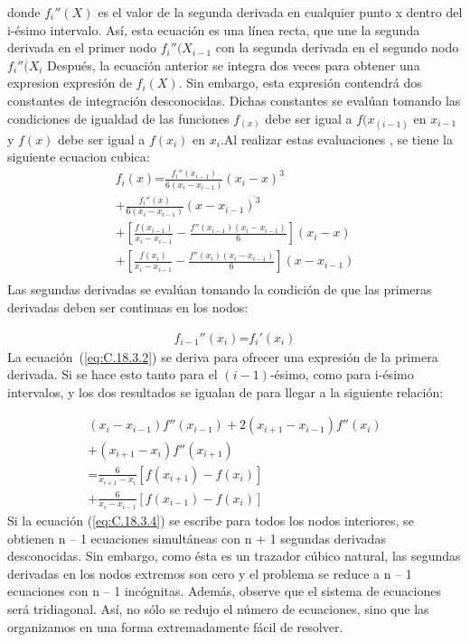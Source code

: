\documentclass[conference]{IEEEtran}
\begin{document}
donde $f_i''(X)$ es el valor de la segunda derivada en cualquier
punto x dentro del i-ésimo intervalo. Así, esta ecuación es una
línea recta, que une la segunda derivada en el primer nodo $f_i''(X_{i-1}$ con la segunda derivada en el segundo nodo $f_i''(X_{i}$ Después, la ecuación anterior se integra dos veces para obtener una expresion expresión de $f_i(X)$. Sin embargo, esta expresión contendrá dos constantes de integración desconocidas. Dichas constantes se evalúan tomando las condiciones de igualdad de
las funciones $f_(x)$ debe ser igual a $f(x_({i-1})$ en $x_{i-1}$ y $f(x)$ debe ser igual a $f(x_i)$ en $x_i$.Al realizar estas evaluaciones , se tiene la siguiente ecuacion cubica: \\
 \begin{multline}
	f_{i}(x) \text{=} \frac{f_{i}''(x_{i - 1})}{6 (x_{i} - x_{i - 1})} {(x_{i} - x)}^{3} \\
	+ \frac{f_{i}''(x)}{6 (x_{i} - x_{i - 1})} {(x - x_{i - 1})}^{3} \\
	+ [\frac{f(x_{i - 1})}{x_{i} - x_{i - 1}} - \frac{f''(x_{i - 1}) (x_{i} - x_{i - 1})}{6}] (x_{i} - x) \\
	+ [\frac{f(x_{i})}{x_{i} - x_{i - 1}} - \frac{f''(x_{i})(x_{i} - x_{i - 1})}{6}](x - x_{i - 1}) \\
	\label{eq:C.18.3.2}
\end{multline}
Las segundas derivadas se evalúan tomando la condición de
que las primeras derivadas deben ser continuas en los nodos:

\begin{align}
	f_{i - 1}''(x_{i}) \text{=} f_{i}'(x_{i})
	\label{eq:C.18.3.3}
\end{align}
La ecuación~(\ref{eq:C.18.3.2}) se deriva para ofrecer una expresión
de la primera derivada. Si se hace esto tanto para el $(i - 1)$-ésimo,
como para i-ésimo intervalos, y los dos resultados se igualan de
para llegar a la siguiente relación:

\begin{multline}
	(x_{i} - x_{i - 1}) f''(x_{i - 1}) + 2(x_{i + 1} - x_{i - 1})f''(x_{i}) \\
	+ (x_{i + 1} - x_{i}) f''(x_{i + 1}) \\
	\text{=} \frac{6}{x_{i + 1} - x_{i}} [f(x_{i + 1}) - f(x_{i})] \\
	+ \frac{6}{x_{i} - x_{i - 1}} [f(x_{i - 1}) - f(x_{i})]
	\label{eq:C.18.3.4}
\end{multline}
Si la ecuación (\ref{eq:C.18.3.4}) se escribe para todos los nodos interiores, se obtienen n – 1 ecuaciones simultáneas con n + 1 segundas
derivadas desconocidas. Sin embargo, como ésta es un trazador
cúbico natural, las segundas derivadas en los nodos extremos son
cero y el problema se reduce a n – 1 ecuaciones con n – 1 incógnitas. Además, observe que el sistema de ecuaciones será tridiagonal. Así, no sólo se redujo el número de ecuaciones, sino que
las organizamos en una forma extremadamente fácil de resolver.
\end{document}
